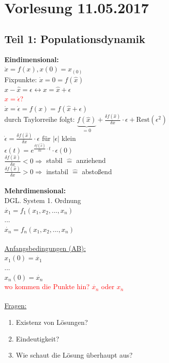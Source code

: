 \section{Vorlesung 11.05.2017}

\subsection{Teil 1: Populationsdynamik}
\textbf{Eindimensional:}\\
$\dot{x}=f(x), x(0)=x_{(0)}$\\
Fixpunkte: $\dot{x}=0=f(\hat{x})$\\

$x-\hat{x}=\epsilon \leftrightarrow x=\hat{x}+\epsilon$\\
\textcolor{red}{$\hat{x}=\dot{\epsilon}$?}\\
$\dot{x}=\dot{\epsilon}=f(x)=f(\hat{x}+\epsilon)$\\
durch Taylorreihe folgt: $\underbrace{f(\hat{x})}_{=0} + \frac{\delta f(\hat{x})}{\delta x} \cdot \epsilon + \text{Rest}(\epsilon^2)$\\
$\dot{\epsilon}=\frac{\delta f(\hat{x})}{\delta x}\cdot \epsilon$ für $|\epsilon|$ klein\\
$\epsilon(t)=e^{\frac{\delta f(\hat{x})}{\delta x}\cdot t} \cdot \epsilon(0)$\\
$\frac{\delta f(\hat{x})}{\delta x} < 0 \Rightarrow$ stabil $\hat{=}$ anziehend\\
$\frac{\delta f(\hat{x})}{\delta x} > 0 \Rightarrow$ instabil $\hat{=}$ abstoßend\\\\

\textbf{Mehrdimensional:}\\
DGL. System 1. Ordnung\\
$\dot{x_1}=f_1(x_1, x_2, ..., x_n)$\\
...\\
$\dot{x_n}=f_n(x_1, x_2, ..., x_n)$\\\\
\underline{Anfangsbedingungen (AB):}\\
$x_1(0)=\dot{x_1}$\\
...\\
$x_n(0)=\dot{x_n}$\\ \textcolor{red}{wo kommen die Punkte hin? $\dot{x_n}$ oder $x_{\dot{n}}$}\\\\

\underline{Fragen:}
\begin{enumerate}
	\item Existenz von Lösungen?
	\item Eindeutigkeit?
	\item Wie schaut die Lösung überhaupt aus?
\end{enumerate}


